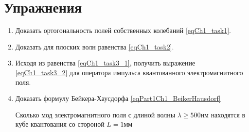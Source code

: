 \section{Упражнения}
\begin{enumerate}
\item Доказать ортогональность полей собственных колебаний
  \eqref{eqCh1_task1}.  
\item Доказать для плоских волн равенства \eqref{eqCh1_task2}.
\item Исходя из равенства \eqref{eqCh1_task3_1}, получить выражение
  \eqref{eqCh1_task3_2} для оператора импульса квантованного
  электромагнитного поля. 
\item Доказать формулу Бейкера-Хаусдорфа \eqref{eqPart1Ch1_BeikerHausdorf}
\item [Сколько мод\label{qQuantelNumberMods}] электромагнитного поля с длиной волны
  $\lambda \ge 500 \mbox{нм}$ находятся в кубе квантования со стороной
  $L=1 \mbox{мм}$ \cite{courseIntroQuantumOpticsCoursera}
\end{enumerate}
